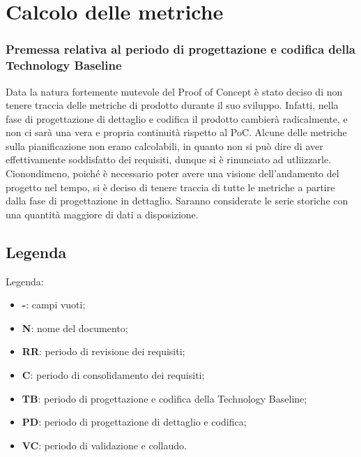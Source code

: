 \section{Calcolo delle metriche}
\subsubsection{Premessa relativa al periodo di progettazione e codifica della Technology Baseline}
Data la natura fortemente mutevole del Proof of Concept è stato deciso di non tenere traccia delle metriche di prodotto durante il suo sviluppo. Infatti, nella fase di progettazione di dettaglio e codifica il prodotto cambierà radicalmente, e non ci sarà una vera e propria continuità rispetto al PoC. \newline
Alcune delle metriche sulla pianificazione non erano calcolabili, in quanto non si può dire di aver effettivamente soddisfatto dei requisiti, dunque si è rinunciato ad utliizzarle.
Cionondimeno, poiché è necessario poter avere una visione dell'andamento del progetto nel tempo, si è deciso di tenere traccia di tutte le metriche a partire dalla fase di progettazione in dettaglio. Saranno considerate le serie storiche con una quantità maggiore di dati a disposizione.

\subsection{Legenda}
Legenda:
\begin{itemize}
	\item \textbf{-}: campi vuoti;
	\item \textbf{N}: nome del documento;
	\item \textbf{RR}: periodo di revisione dei requisiti;
	\item \textbf{C}: periodo di consolidamento dei requisiti;
	\item \textbf{TB}: periodo di progettazione e codifica della Technology Baseline;
	\item \textbf{PD}: periodo di progettazione di dettaglio e codifica;
	\item \textbf{VC}: periodo di validazione e collaudo.
\end{itemize}


